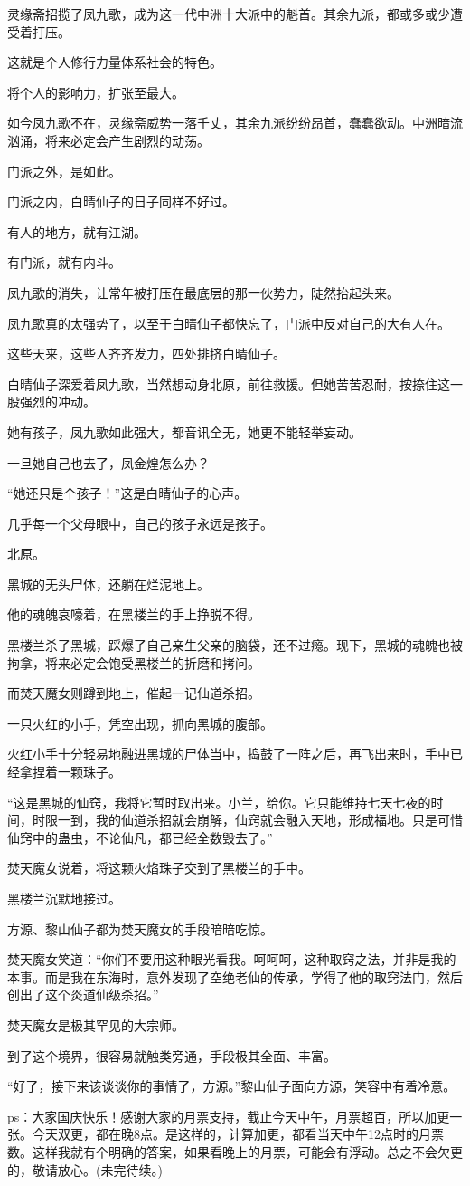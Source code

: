 \begin{this_body}
灵缘斋招揽了凤九歌，成为这一代中洲十大派中的魁首。其余九派，都或多或少遭受着打压。

这就是个人修行力量体系社会的特色。

将个人的影响力，扩张至最大。

如今凤九歌不在，灵缘斋威势一落千丈，其余九派纷纷昂首，蠢蠢欲动。中洲暗流汹涌，将来必定会产生剧烈的动荡。

门派之外，是如此。

门派之内，白晴仙子的日子同样不好过。

有人的地方，就有江湖。

有门派，就有内斗。

凤九歌的消失，让常年被打压在最底层的那一伙势力，陡然抬起头来。

凤九歌真的太强势了，以至于白晴仙子都快忘了，门派中反对自己的大有人在。

这些天来，这些人齐齐发力，四处排挤白晴仙子。

白晴仙子深爱着凤九歌，当然想动身北原，前往救援。但她苦苦忍耐，按捺住这一股强烈的冲动。

她有孩子，凤九歌如此强大，都音讯全无，她更不能轻举妄动。

一旦她自己也去了，凤金煌怎么办？

“她还只是个孩子！”这是白晴仙子的心声。

几乎每一个父母眼中，自己的孩子永远是孩子。

北原。

黑城的无头尸体，还躺在烂泥地上。

他的魂魄哀嚎着，在黑楼兰的手上挣脱不得。

黑楼兰杀了黑城，踩爆了自己亲生父亲的脑袋，还不过瘾。现下，黑城的魂魄也被拘拿，将来必定会饱受黑楼兰的折磨和拷问。

而焚天魔女则蹲到地上，催起一记仙道杀招。

一只火红的小手，凭空出现，抓向黑城的腹部。

火红小手十分轻易地融进黑城的尸体当中，捣鼓了一阵之后，再飞出来时，手中已经拿捏着一颗珠子。

“这是黑城的仙窍，我将它暂时取出来。小兰，给你。它只能维持七天七夜的时间，时限一到，我的仙道杀招就会崩解，仙窍就会融入天地，形成福地。只是可惜仙窍中的蛊虫，不论仙凡，都已经全数毁去了。”

焚天魔女说着，将这颗火焰珠子交到了黑楼兰的手中。

黑楼兰沉默地接过。

方源、黎山仙子都为焚天魔女的手段暗暗吃惊。

焚天魔女笑道：“你们不要用这种眼光看我。呵呵呵，这种取窍之法，并非是我的本事。而是我在东海时，意外发现了空绝老仙的传承，学得了他的取窍法门，然后创出了这个炎道仙级杀招。”

焚天魔女是极其罕见的大宗师。

到了这个境界，很容易就触类旁通，手段极其全面、丰富。

“好了，接下来该谈谈你的事情了，方源。”黎山仙子面向方源，笑容中有着冷意。

ps：大家国庆快乐！感谢大家的月票支持，截止今天中午，月票超百，所以加更一张。今天双更，都在晚8点。是这样的，计算加更，都看当天中午12点时的月票数。这样我就有个明确的答案，如果看晚上的月票，可能会有浮动。总之不会欠更的，敬请放心。(未完待续。)

\end{this_body}

